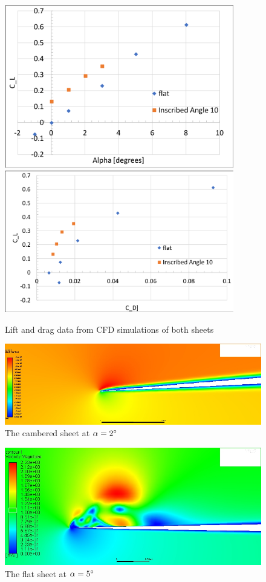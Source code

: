 \documentclass[12pt]{report} %
\begin{document}
\begin{figure}
\includegraphics[width = 10cm]{lift.png}
\includegraphics[width = 10cm]{polar.png}
\caption{Lift and drag data from CFD simulations of both sheets}
\label{cfd_polar}
\end{figure}

\begin{figure}
\includegraphics[width = 20cm]{alpha2.jpg}
\caption{The cambered sheet at $\alpha = 2\degree$}
\label{cambered_velocity}
\end{figure}

\begin{figure}
\includegraphics[width = 20cm]{flat.jpg}
\caption{The flat sheet at $\alpha = 5\degree$}
\label{flat_velocity}
\end{figure}
\end{document}
